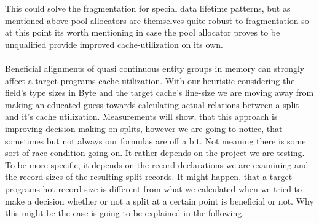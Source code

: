 This could solve the fragmentation for special data lifetime patterns, but as mentioned above pool allocators are themselves quite robust to fragmentation so at this point its worth mentioning in case the pool allocator proves to be unqualified provide improved cache-utilization on its own.\\\\
Beneficial alignments of quasi continuous entity groups in memory can strongly affect a target programs cache utilization. With our heuristic considering the field's type sizes in Byte and the target cache's line-size we are moving away from making an educated guess towards calculating actual relations between a split and it's cache utilization. Measurements will show, that this approach is improving decision making on splits, however we are going to notice, that sometimes but not always our formulas are off a bit. Not meaning there is some sort of race condition going on. It rather depends on the project we are testing. To be more specific, it depends on the record declarations we are examining and the record sizes of the resulting split records. It might happen, that a target programs hot-record size is different from what we calculated when we tried to make a decision whether or not a split at a certain point is beneficial or not. Why this might be the case is going to be explained in the following.


